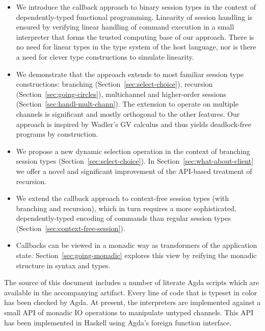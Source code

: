 \documentclass[acmsmall,review,anonymous,screen]{acmart}
\begin{document}
\begin{itemize}
\item We introduce the callback approach to binary session
  types in the context of dependently-typed functional
  programming.
  Linearity of session handling is ensured by verifying linear
  handling of command execution in a small interpreter that forms the
  trusted computing base of our approach. There is no need for linear
  types in the type system of the host language, nor is there a need
  for clever type constructions to simulate linearity.
\item We demonstrate that the approach extends to most familiar
  session type constructions: branching
  (Section~\ref{sec:select-choice}), recursion
  (Section~\ref{sec:going-circles}), multichannel and
  higher-order sessions (Section~\ref{sec:handl-mult-chann}). 
  The extension to operate on multiple channels is significant and
  mostly orthogonal to the other features. Our approach is inspired by
  Wadler's GV calculus \cite{DBLP:journals/jfp/Wadler14} and thus
  yields deadlock-free programs by construction. 
\item We propose a new dynamic selection operation in the context of
  branching session types (Section~\ref{sec:select-choice}).
  In Section~\ref{sec:what-about-client} we offer a novel and significant
  improvement of the API-based treatment of recursion.
\item We extend the callback approach to context-free session types
  (with branching and recursion), which in turn requires a more
  sophisticated, dependently-typed encoding of commands than regular
  session types (Section~\ref{sec:context-free-session}).
\item Callbacks can be viewed in a monadic way as transformers of the
  application state. Section~\ref{sec:going-monadic} explores this
  view by reifying the monadic structure in syntax and types.
\end{itemize}

The source of this document includes a number of literate Agda
scripts which are available in the accompanying artifact. Every line
of code that is typeset in color has been checked by Agda. At present,
the interpreters are implemented against a small API of monadic IO
operations to manipulate untyped channels. This API has been
implemented in Haskell using Agda's foreign function interface.
\end{document}

